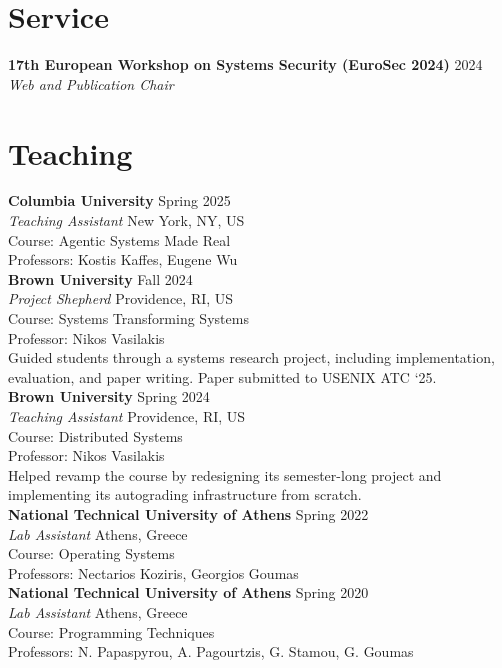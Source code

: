 \documentclass[margin, 12pt]{resume}
\newcommand{\sectionVSpace}{\vspace{-3.5ex}} %
\newcommand{\institution}[1]{\textbf{#1}\xspace}
\newcommand{\rSection}[1]{\sectionVSpace\section{#1}\xspace}
\newcommand{\role}[1]{\textit{#1}\xspace}
\newcommand{\service}[1]{\textbf{#1}\xspace}
\newcommand{\stitle}[1]{#1:\xspace}
\begin{document}
\begin{resume}
    \rSection{Service}

    \service{17th European Workshop on Systems Security (EuroSec 2024)} \hfill 2024 \\
    \role{Web and Publication Chair} \\

    \rSection{Teaching}

    \institution{Columbia University} \hfill Spring 2025 \\
    \role{Teaching Assistant} \hfill New York, NY, US \\
    \stitle{Course} Agentic Systems Made Real \\
    \stitle{Professors} Kostis Kaffes, Eugene Wu \\

    \institution{Brown University} \hfill Fall 2024 \\
    \role{Project Shepherd} \hfill Providence, RI, US \\
    \stitle{Course} Systems Transforming Systems \\
    \stitle{Professor} Nikos Vasilakis \\
    Guided students through a systems research project, including implementation, evaluation, and paper writing. Paper submitted to USENIX ATC `25. \\

    \institution{Brown University} \hfill Spring 2024 \\
    \role{Teaching Assistant} \hfill Providence, RI, US \\
    \stitle{Course} Distributed Systems \\
    \stitle{Professor} Nikos Vasilakis \\
    Helped revamp the course by redesigning its semester-long project and implementing its autograding infrastructure from scratch. \\

    \institution{National Technical University of Athens} \hfill Spring 2022 \\
    \role{Lab Assistant} \hfill Athens, Greece \\
    \stitle{Course} Operating Systems \\
    \stitle{Professors} Nectarios Koziris, Georgios Goumas \\

    \institution{National Technical University of Athens} \hfill Spring 2020 \\
    \role{Lab Assistant} \hfill Athens, Greece \\
    \stitle{Course} Programming Techniques \\
    \stitle{Professors} N. Papaspyrou, A. Pagourtzis, G. Stamou, G. Goumas \\


\end{resume}
\end{document}
